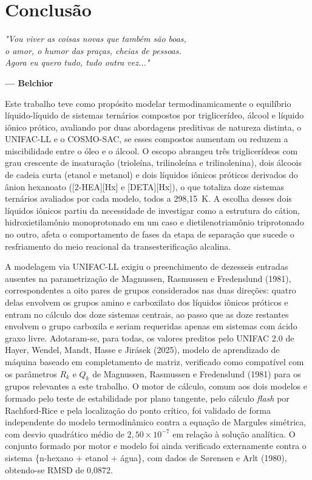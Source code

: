 \chapter{Conclusão}
\label{conclusao}

\epigraph{\textit{"Vou viver as coisas novas que também são boas,\\
o amor, o humor das praças, cheias de pessoas.\\
Agora eu quero tudo, tudo outra vez..."}}{\textbf{--- Belchior}}

Este trabalho teve como propósito modelar termodinamicamente o equilíbrio líquido-líquido de sistemas ternários compostos por triglicerídeo, álcool e líquido iônico prótico, avaliando por duas abordagens preditivas de natureza distinta, o UNIFAC-LL e o COSMO-SAC, se esses compostos aumentam ou reduzem a miscibilidade entre o óleo e o álcool. O escopo abrangeu três triglicerídeos com grau crescente de insaturação (trioleína, trilinoleína e trilinolenina), dois álcoois de cadeia curta (etanol e metanol) e dois líquidos iônicos próticos derivados do ânion hexanoato ([2-HEA][Hx] e [DETA][Hx]), o que totaliza doze sistemas ternários avaliados por cada modelo, todos a 298,15~K. A escolha desses dois líquidos iônicos partiu da necessidade de investigar como a estrutura do cátion, hidroxietilamônio monoprotonado em um caso e dietilenotriamônio triprotonado no outro, afeta o comportamento de fases da etapa de separação que sucede o resfriamento do meio reacional da transesterificação alcalina.

A modelagem via UNIFAC-LL exigiu o preenchimento de dezesseis entradas ausentes na parametrização de Magnussen, Rasmussen e Fredenslund (1981), correspondentes a oito pares de grupos considerados nas duas direções: quatro delas envolvem os grupos amino e carboxilato dos líquidos iônicos próticos e entram no cálculo dos doze sistemas centrais, ao passo que as doze restantes envolvem o grupo carboxila e seriam requeridas apenas em sistemas com ácido graxo livre. Adotaram-se, para todas, os valores preditos pelo UNIFAC 2.0 de Hayer, Wendel, Mandt, Hasse e Jirásek (2025), modelo de aprendizado de máquina baseado em completamento de matriz, verificado como compatível com os parâmetros $R_k$ e $Q_k$ de Magnussen, Rasmussen e Fredenslund (1981) para os grupos relevantes a este trabalho. O motor de cálculo, comum aos dois modelos e formado pelo teste de estabilidade por plano tangente, pelo cálculo \textit{flash} por Rachford-Rice e pela localização do ponto crítico, foi validado de forma independente do modelo termodinâmico contra a equação de Margules simétrica, com desvio quadrático médio de $2{,}50 \times 10^{-7}$ em relação à solução analítica. O conjunto formado por motor e modelo foi ainda verificado externamente contra o sistema \{n-hexano + etanol + água\}, com dados de Sørensen e Arlt (1980), obtendo-se RMSD de 0,0872.

